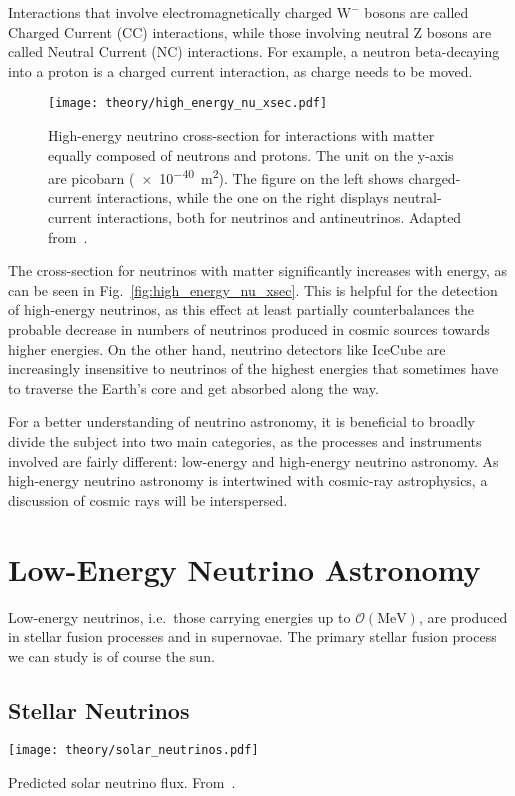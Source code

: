 Interactions that involve electromagnetically charged $\text{W}^-$ bosons are called Charged Current (CC) interactions, while those involving neutral Z bosons are called Neutral Current (NC) interactions. For example, a neutron beta-decaying into a proton is a charged current interaction, as charge needs to be moved.

\begin{figure}[htb]
  \texttt{[image: theory/high\_energy\_nu\_xsec.pdf]}
  \caption[High-energy neutrino cross-section]{High-energy neutrino cross-section for interactions with matter equally composed of neutrons and protons. The unit on the y-axis are picobarn (\SI{e-40}{\m\squared}). The figure on the left shows charged-current interactions, while the one on the right displays neutral-current interactions, both for neutrinos and antineutrinos. Adapted from~\cite{CooperSarkar2011}.}
\end{figure}

The cross-section for neutrinos with matter significantly increases with energy, as can be seen in Fig.~\ref{fig:high_energy_nu_xsec}. This is helpful for the detection of high-energy neutrinos, as this effect at least partially counterbalances the probable decrease in numbers of neutrinos produced in cosmic sources towards higher energies. On the other hand, neutrino detectors like IceCube are increasingly insensitive to neutrinos of the highest energies that sometimes have to traverse the Earth's core and get absorbed along the way.

\pagebreak

For a better understanding of neutrino astronomy, it is beneficial to broadly divide the subject into two main categories, as the processes and instruments involved are fairly different: low-energy and high-energy neutrino astronomy. As high-energy neutrino astronomy is intertwined with cosmic-ray astrophysics, a discussion of cosmic rays will be interspersed.

\section{Low-Energy Neutrino Astronomy}
Low-energy neutrinos, i.e.\ those carrying energies up to $\mathcal{O}(\unit{\mega\eV})$, are produced in stellar fusion processes and in supernovae. The primary stellar fusion process we can study is of course the sun.

\subsection{Stellar Neutrinos}
\begin{marginfigure}
  \texttt{[image: theory/solar\_neutrinos.pdf]}
  \caption[Predicted solar neutrino flux]{Predicted solar neutrino flux. From~\cite{Agostini2018}.}
\end{marginfigure}

